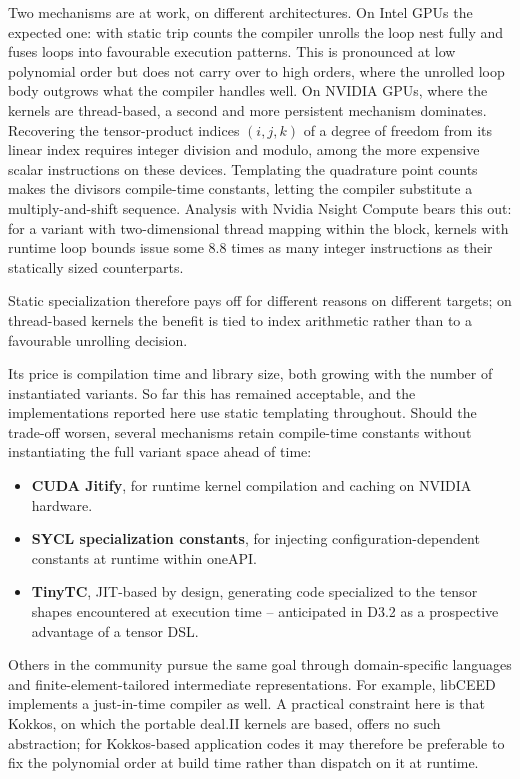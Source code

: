 \documentclass[a4paper,12pt]{article}
\begin{document}
Two mechanisms are at work, on different architectures.
On Intel GPUs the expected one: with static trip counts the compiler unrolls the loop nest fully and fuses loops into favourable execution patterns.
This is pronounced at low polynomial order but does not carry over to high orders, where the unrolled loop body outgrows what the compiler handles well.
On NVIDIA GPUs, where the kernels are thread-based, a second and more persistent mechanism dominates.
Recovering the tensor-product indices $(i,j,k)$ of a degree of freedom from its linear index requires integer division and modulo, among the more expensive scalar instructions on these devices.
Templating the quadrature point counts makes the divisors compile-time constants, letting the compiler substitute a multiply-and-shift sequence.
Analysis with Nvidia Nsight Compute bears this out: for a variant with two-dimensional thread mapping within the block, kernels with runtime loop bounds issue some 8.8 times as many integer instructions as their statically sized counterparts.

Static specialization therefore pays off for different reasons on different targets; on thread-based kernels the benefit is tied to index arithmetic rather than to a favourable unrolling decision.

Its price is compilation time and library size, both growing with the number of instantiated variants.
So far this has remained acceptable, and the implementations reported here use static templating throughout.
Should the trade-off worsen, several mechanisms retain compile-time constants without instantiating the full variant space ahead of time:

\begin{itemize}
    \item \textbf{CUDA Jitify}, for runtime kernel compilation and caching on NVIDIA hardware.
    \item \textbf{SYCL specialization constants}, for injecting configuration-dependent constants at runtime within oneAPI.
    \item \textbf{TinyTC}, JIT-based by design, generating code specialized to the tensor shapes encountered at execution time -- anticipated in D3.2 as a prospective advantage of a tensor DSL.
\end{itemize}

Others in the community pursue the same goal through domain-specific languages and finite-element-tailored intermediate representations. For example, libCEED implements a just-in-time compiler as well.
A practical constraint here is that Kokkos, on which the portable deal.II kernels are based, offers no such abstraction; for Kokkos-based application codes it may therefore be preferable to fix the polynomial order at build time rather than dispatch on it at runtime.
\end{document}
